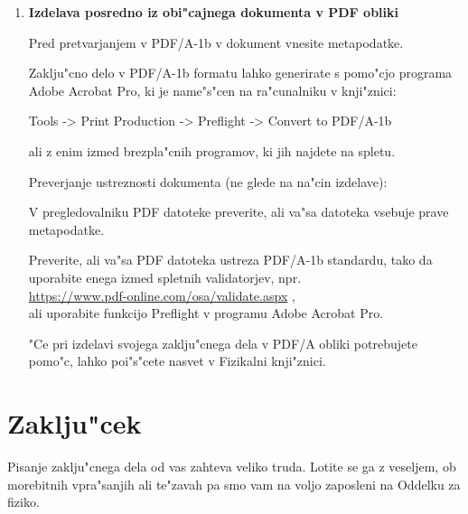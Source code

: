 \begin{enumerate}
\item{\bf  Izdelava posredno iz obi"cajnega dokumenta v PDF obliki}


Pred pretvarjanjem v PDF/A-1b v dokument vnesite metapodatke.

Zaklju"cno delo v PDF/A-1b formatu lahko generirate s pomo"cjo programa Adobe Acrobat Pro, ki je name"s"cen na ra"cunalniku v knji"znici:

Tools -> Print Production -> Preflight -> Convert to PDF/A-1b

ali z enim izmed brezpla"cnih programov, ki jih najdete na spletu.

Preverjanje ustreznosti dokumenta (ne glede na na"cin izdelave):

V pregledovalniku PDF datoteke preverite, ali va"sa datoteka vsebuje prave metapodatke.

Preverite, ali va"sa PDF datoteka ustreza PDF/A-1b standardu, tako da uporabite enega izmed spletnih validatorjev, npr.\\
\url{https://www.pdf-online.com/osa/validate.aspx} \cite{Val},\\
ali uporabite funkcijo Preflight v programu Adobe Acrobat Pro.

"Ce pri izdelavi svojega zaklju"cnega dela v PDF/A obliki potrebujete pomo"c, lahko poi"s"cete nasvet v Fizikalni knji"znici.

\end{enumerate}

%
\chapter{Zaklju"cek}

Pisanje zaklju"cnega dela od vas zahteva veliko truda. Lotite se ga z veseljem, ob morebitnih vpra"sanjih ali te"zavah pa smo vam na voljo zaposleni na Oddelku za fiziko.



\cleardoublepage{}
\renewcommand\bibname{Literatura}





